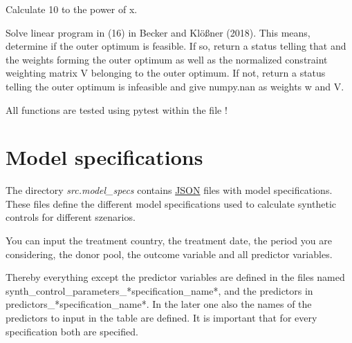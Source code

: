 \documentclass[a4paper,11pt,english]{sphinxmanual}
\begin{document}

\begin{fulllineitems}
\label{model_code:src.model_code.synth_control_functions.ten_to_the_power_of_x}
Calculate 10 to the power of x.

\end{fulllineitems}


\begin{fulllineitems}
\label{model_code:src.model_code.synth_control_functions.try_if_unrestricted_outer_optimum_feasible}
Solve linear program in (16) in Becker and Klößner (2018).
This means, determine if the outer optimum is feasible.
If so, return a status telling that and the weights forming the outer
optimum as well as the normalized constraint weighting matrix V belonging
to the outer optimum. If not, return a status telling the outer optimum is
infeasible and give numpy.nan as weights w and V.

\end{fulllineitems}


All functions are tested using pytest within the file !


\chapter{Model specifications}
\label{model_specs:model-specifications}\label{model_specs:id1}\label{model_specs::doc}
The directory \emph{src.model\_specs} contains \href{http://www.json.org/}{JSON} files with model specifications.
These files define the different model specifications used to calculate synthetic controls for different szenarios.

You can input the treatment country, the treatment date, the period you are considering, the donor pool, the outcome variable and all predictor variables.

Thereby everything except the predictor variables are defined in the files named synth\_control\_parameters\_*specification\_name*, and the predictors in predictors\_*specification\_name*. In the later one also the names of the predictors to input in the table are defined.
It is important that for every specification both are specified.
\end{document}
